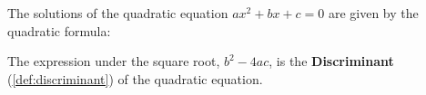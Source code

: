 
\begin{review}
  \label{def:quadratic_equation}

\end{review}

The solutions of the quadratic equation $ax^{2} + bx + c = 0$ are given by the
quadratic formula:

The expression under the square root, $b^{2} - 4ac$, is the
\textbf{Discriminant} (\ref{def:discriminant}) of the
quadratic equation.

\newpage

